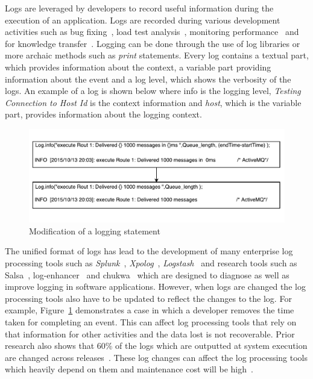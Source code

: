 

Logs are leveraged by developers to record useful information during the execution of an application. Logs are recorded during various development activities such as bug fixing~\cite{ConsoleLogs,JGLouMining,QFuanomaly}, load test analysis~\cite{Automatic}, monitoring performance~\cite{Yuan} and for knowledge transfer~\cite{IanWCRE}.
Logging can be done through the use of log libraries or more archaic methods such as \textsl{print} statements. Every log contains a textual part, which provides information about the context, a variable part providing information about the event and a log level, which shows the verbosity of the logs. An example of a log is shown below where info is the logging level, \textsl{Testing Connection to Host Id} is the context information and \textsl{host}, which is the variable part, provides information about the logging context.

\begin{figure}[tb]
	\centering
	\includegraphics[width=1\columnwidth]{ExampleOfLogChange_LPA}
	\caption{Modification of a logging statement}
	\label{fig:ExampleOfLogChange_LPA}
\end{figure}


The unified format of logs has lead to the development of many enterprise log processing tools such as \textsl{Splunk}~\cite{carasso2012exploring}, \textsl{Xpolog}~\cite{xpolog}, \textsl{Logstash}~\cite{xu2013detecting} and research tools such as Salsa~\cite{TanSalsa}, log-enhancer~\cite{Yuan} and chukwa~\cite{chukwa} which are designed to diagnose as well as improve logging in software applications. However, when logs are changed the log processing tools also have to be updated to reflect the changes to the log. For example, Figure~\ref{fig:ExampleOfLogChange_LPA} demonstrates a case in which a developer removes the time taken for completing an event. This can affect log processing tools that rely on that information for other activities and the data lost is not recoverable. Prior research also shows that 60\% of the logs which are outputted at system execution are changed across releases~\cite{IanWCRE}. These log changes can affect the log processing tools which heavily depend on them and maintenance cost will be high~\cite{IanWCRE}. 

